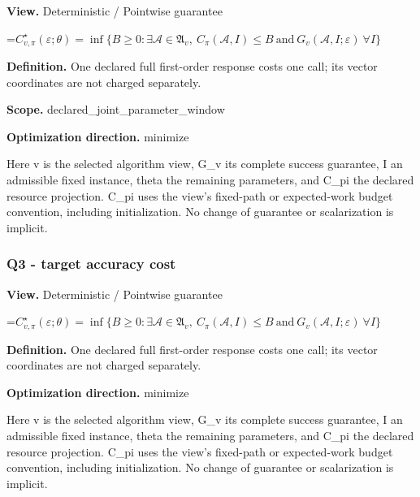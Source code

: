 \documentclass[10pt,a4paper]{article}
\newcommand{\AtlasMath}[1]{\par\begingroup\centering\setbox0=\hbox{$\displaystyle #1$}\ifdim\wd0>1.4\linewidth\typeout{ATLAS WIDE FORMULA: \the\wd0}\fi\ifdim\wd0>\linewidth\resizebox{\linewidth}{!}{\box0}\else\box0\fi\par\endgroup}
\begin{document}
\textbf{View.} Deterministic / Pointwise guarantee



\AtlasMath{C^\star_{v,\pi}(\varepsilon;\theta)=\inf\{B\ge0:\exists\mathcal A\in\mathfrak A_v,\ C_\pi(\mathcal A,I)\le B\ \text{and}\ G_v(\mathcal A,I;\varepsilon)\ \forall I\}}


\textbf{Definition.} One declared full first-order response costs one call; its vector coordinates are not charged separately.



\textbf{Scope.} declared\_joint\_parameter\_window



\textbf{Optimization direction.} minimize



Here v is the selected algorithm view, G\_v its complete success guarantee, I an admissible fixed instance, theta the remaining parameters, and C\_pi the declared resource projection. C\_pi uses the view's fixed-path or expected-work budget convention, including initialization. No change of guarantee or scalarization is implicit.



\subsubsection{Q3 - target accuracy cost}


\textbf{View.} Deterministic / Pointwise guarantee



\AtlasMath{C^\star_{v,\pi}(\varepsilon;\theta)=\inf\{B\ge0:\exists\mathcal A\in\mathfrak A_v,\ C_\pi(\mathcal A,I)\le B\ \text{and}\ G_v(\mathcal A,I;\varepsilon)\ \forall I\}}


\textbf{Definition.} One declared full first-order response costs one call; its vector coordinates are not charged separately.



\textbf{Optimization direction.} minimize



Here v is the selected algorithm view, G\_v its complete success guarantee, I an admissible fixed instance, theta the remaining parameters, and C\_pi the declared resource projection. C\_pi uses the view's fixed-path or expected-work budget convention, including initialization. No change of guarantee or scalarization is implicit.
\end{document}
